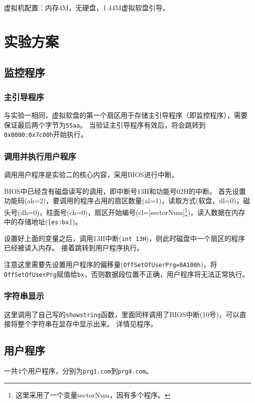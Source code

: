 \documentclass[logo,reportComp]{thesis}
\begin{document}
虚拟机配置：内存4M，无硬盘，1.44M虚拟软盘引导。

\section{实验方案}
\subsection{监控程序}
\subsubsection{主引导程序}
与实验一相同，虚拟软盘的第一个扇区用于存储主引导程序（即监控程序），需要保证最后两个字节为\verb'55aa'。
当验证主引导程序有效后，将会跳转到\verb'0x0000:0x7c00h'开始执行。

\subsubsection{调用并执行用户程序}
调用用户程序是实验二的核心内容，采用BIOS进行中断。

BIOS中已经含有磁盘读写的调用，即中断号13H和功能号02H的中断。
首先设置功能码(ah=2)，要调用的程序占用的扇区数量(al=1)，读取方式(软盘，dl=0)，磁头号(dh=0)，柱面号(ch=0)，扇区开始编号(cl=[sectorNum]\footnote{这里采用了一个变量sectorNum，因有多个程序。})，读入数据在内存中的存储地址(\verb'[es:bx]')。

设置好上面的变量之后，调用13H中断(\verb'int 13H')，则此时磁盘中一个扇区的程序已经被读入内存。
接着跳转到用户程序执行。

注意这里需要先设置用户程序的偏移量(\verb'OffSetOfUserPrg=0A100h')，将\verb'OffSetOfUserPrg'赋值给\verb'bx'，否则数据段位置不正确，用户程序将无法正常执行。

\subsubsection{字符串显示}
这里调用了自己写的\verb'showstring'函数，里面同样调用了BIOS中断(10号)，可以直接将整个字符串在显存中显示出来。
详情见程序。

\subsection{用户程序}
一共4个用户程序，分别为\verb'prg1.com'到\verb'prg4.com'。
\end{document}
